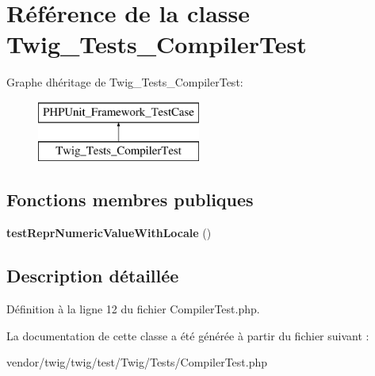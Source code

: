 \hypertarget{class_twig___tests___compiler_test}{}\section{Référence de la classe Twig\+\_\+\+Tests\+\_\+\+Compiler\+Test}
\label{class_twig___tests___compiler_test}
Graphe d\textquotesingle{}héritage de Twig\+\_\+\+Tests\+\_\+\+Compiler\+Test\+:\begin{figure}[H]
\begin{center}
\leavevmode
\includegraphics[height=2.000000cm]{class_twig___tests___compiler_test}
\end{center}
\end{figure}
\subsection*{Fonctions membres publiques}
\begin{DoxyCompactItemize}
\item 
{\bfseries test\+Repr\+Numeric\+Value\+With\+Locale} ()\hypertarget{class_twig___tests___compiler_test_a4fdf7b51f95c93ba803cad3b9607875d}{}\label{class_twig___tests___compiler_test_a4fdf7b51f95c93ba803cad3b9607875d}

\end{DoxyCompactItemize}


\subsection{Description détaillée}


Définition à la ligne 12 du fichier Compiler\+Test.\+php.



La documentation de cette classe a été générée à partir du fichier suivant \+:\begin{DoxyCompactItemize}
\item 
vendor/twig/twig/test/\+Twig/\+Tests/Compiler\+Test.\+php\end{DoxyCompactItemize}
